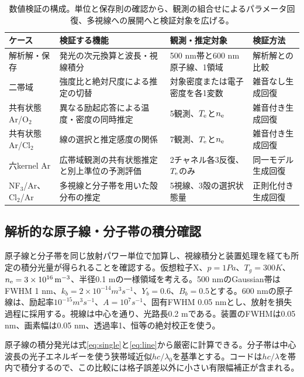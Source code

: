 \begin{table}[htbp]
\centering\small
\begin{tabularx}{\linewidth}{p{25mm}YYp{28mm}}
\toprule
ケース & 検証する機能 & 観測・推定対象 & 検証方法 \\
\midrule
解析解・保存 & 発光の次元換算と波長・視線積分 & 500 nm帯と600 nm原子線、1領域 & 解析解との比較 \\
二帯域 & 強度比と絶対尺度による推定の切替 & 対象密度または電子密度を各1変数 & 雑音なし生成回復 \\
共有状態Ar/O$_2$ & 異なる励起応答による温度・密度の同時推定 & 5観測、$T_{\mathrm e}$と$n_{\mathrm e}$ & 雑音付き生成回復 \\
共有状態Ar/Cl$_2$ & 線の選択と推定感度の関係 & 7観測、$T_{\mathrm e}$と$n_{\mathrm e}$ & 雑音付き生成回復 \\
六kernel Ar & 広帯域観測の共有状態推定と別上準位の予測評価 & 2チャネル各3反復、$T_{\mathrm e}$のみ & 同一モデル生成回復 \\
NF$_3$/Ar、Cl$_2$/Ar & 多視線と分子帯を用いた殻分布の推定 & 5視線、3殻の選択状態量 & 正則化付き生成回復 \\
\bottomrule
\end{tabularx}
\caption{数値検証の構成。単位と保存則の確認から、観測の組合せによるパラメータ回復、多視線への展開へと検証対象を広げる。}
\end{table}

\subsection{解析的な原子線・分子帯の積分確認}
原子線と分子帯を同じ放射パワー単位で加算し、視線積分と装置処理を経ても所定の積分光量が得られることを確認する。仮想粒子X、$p=1\unit{Pa}$、$T_g=300\unit{K}$、$n_{\mathrm e}=3\times10^{16}\,\mathrm{m^{-3}}$、半径0.1 mの一様領域を考える。500 nmのGaussian帯はFWHM 1 nm、$k_b=2\times10^{-14}\unit{m^3s^{-1}}$、$Y_b=0.6$、$B_b=0.5$とする。600 nmの原子線は、励起率$10^{-15}\unit{m^3s^{-1}}$、$A=10^7\unit{s^{-1}}$、固有FWHM 0.05 nmとし、放射を損失過程に採用する。視線は中心を通り、光路長0.2 mである。装置のFWHMは0.05 nm、画素幅は0.05 nm、透過率1、恒等の絶対校正を使う。

原子線の積分発光は式\eqref{eq:single}と\eqref{eq:line}から厳密に計算できる。分子帯は中心波長の光子エネルギーを使う狭帯域近似$hc/\lambda_0$を基準とする。コードは$hc/\lambda$を帯内で積分するので、この比較には格子誤差以外に小さい有限幅補正が含まれる。

